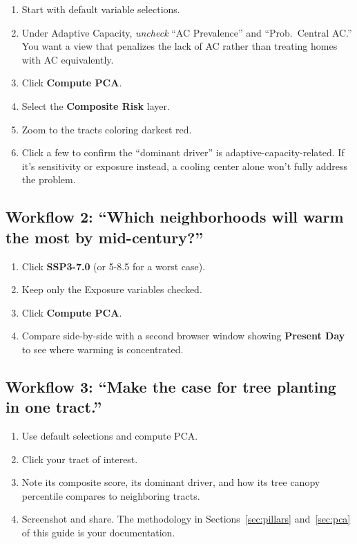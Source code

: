 \documentclass[11pt]{article}
\begin{document}
\begin{enumerate}[leftmargin=*]
  \item Start with default variable selections.
  \item Under \textcolor{adaptive}{Adaptive Capacity}, \textit{uncheck}
        ``AC Prevalence'' and ``Prob.\ Central AC.'' You want a view that
        penalizes the lack of AC rather than treating homes with AC
        equivalently.
  \item Click \textbf{Compute PCA}.
  \item Select the \textbf{Composite Risk} layer.
  \item Zoom to the tracts coloring darkest red.
  \item Click a few to confirm the ``dominant driver'' is
        adaptive-capacity-related. If it's sensitivity or exposure instead,
        a cooling center alone won't fully address the problem.
\end{enumerate}

\subsection{Workflow 2: ``Which neighborhoods will warm the most by mid-century?''}

\begin{enumerate}[leftmargin=*]
  \item Click \textbf{SSP3-7.0} (or 5-8.5 for a worst case).
  \item Keep only the \textcolor{exposure}{Exposure} variables checked.
  \item Click \textbf{Compute PCA}.
  \item Compare side-by-side with a second browser window showing
        \textbf{Present Day} to see where warming is concentrated.
\end{enumerate}

\subsection{Workflow 3: ``Make the case for tree planting in one tract.''}

\begin{enumerate}[leftmargin=*]
  \item Use default selections and compute PCA.
  \item Click your tract of interest.
  \item Note its composite score, its dominant driver, and how its tree
        canopy percentile compares to neighboring tracts.
  \item Screenshot and share. The methodology in Sections~\ref{sec:pillars}
        and~\ref{sec:pca} of this guide is your documentation.
\end{enumerate}
\end{document}
